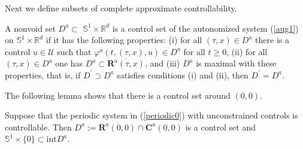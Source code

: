 \documentclass{siamltex}%
\begin{document}
Next we define subsets of complete approximate controllability.

\begin{definition}
\label{Definition_control_sets}A nonvoid set $D^{a}\subset$ $\mathbb{S}%
^{1}\times\mathbb{R}^{d}$ is a control set of the autonomized system
(\ref{aug1}) on $\mathbb{S}^{1}\times\mathbb{R}^{d}$ if it has the following
properties: (i) for all $(\tau,x)\in D^{a}$ there is a control $u\in
\mathcal{U}$ such that $\varphi^{a}(t,(\tau,x),u)\in D^{a}$ for all $t\geq0$,
(ii) for all $(\tau,x)\in D^{a}$ one has $D^{a}\subset\overline{\mathbf{R}%
^{a}(\tau,x)}$, and (iii) $D^{a}$ is maximal with these properties, that is,
if $D^{\prime}\supset D^{a}$ satisfies conditions (i) and (ii), then
$D^{\prime}=D^{a}$.
\end{definition}

The following lemma shows that there is a control set around $(0,0)$.

\begin{lemma}
\label{Lemma_point}Suppose that the periodic system in (\ref{periodic0}) with
unconstrained controls is controllable. Then $D^{a}:=\overline{\mathbf{R}%
^{a}(0,0)}\cap\mathbf{C}^{a}(0,0)$ is a control set and $\mathbb{S}^{1}%
\times\{0\}\subset\mathrm{int}D^{a}$.
\end{lemma}
\end{document}
